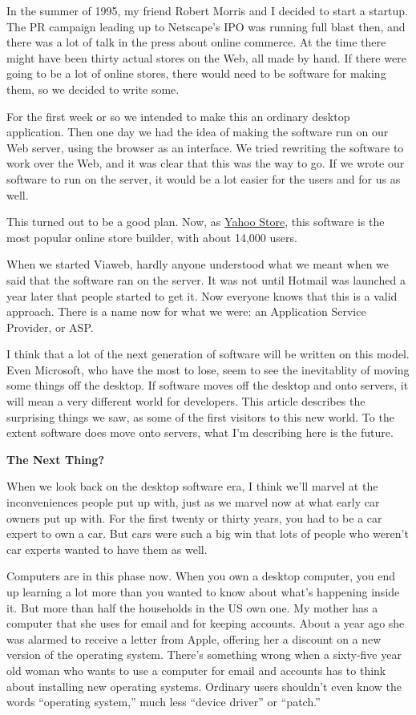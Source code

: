 \documentclass[12pt]{book}
\begin{document}
In the summer of 1995, my friend Robert Morris and I decided to start a
startup. The PR campaign leading up to Netscape's IPO was running full
blast then, and there was a lot of talk in the press about online
commerce. At the time there might have been thirty actual stores on the
Web, all made by hand. If there were going to be a lot of online stores,
there would need to be software for making them, so we decided to write
some.

For the first week or so we intended to make this an ordinary desktop
application. Then one day we had the idea of making the software run on
our Web server, using the browser as an interface. We tried rewriting
the software to work over the Web, and it was clear that this was the
way to go. If we wrote our software to run on the server, it would be a
lot easier for the users and for us as well.

This turned out to be a good plan. Now, as
\href{http://store.yahoo.com}{Yahoo Store}, this software is the most
popular online store builder, with about 14,000 users.

When we started Viaweb, hardly anyone understood what we meant when we
said that the software ran on the server. It was not until Hotmail was
launched a year later that people started to get it. Now everyone knows
that this is a valid approach. There is a name now for what we were: an
Application Service Provider, or ASP.

I think that a lot of the next generation of software will be written on
this model. Even Microsoft, who have the most to lose, seem to see the
inevitablity of moving some things off the desktop. If software moves
off the desktop and onto servers, it will mean a very different world
for developers. This article describes the surprising things we saw, as
some of the first visitors to this new world. To the extent software
does move onto servers, what I'm describing here is the future.

\textbf{The Next Thing?}

When we look back on the desktop software era, I think we'll marvel at
the inconveniences people put up with, just as we marvel now at what
early car owners put up with. For the first twenty or thirty years, you
had to be a car expert to own a car. But cars were such a big win that
lots of people who weren't car experts wanted to have them as well.

Computers are in this phase now. When you own a desktop computer, you
end up learning a lot more than you wanted to know about what's
happening inside it. But more than half the households in the US own
one. My mother has a computer that she uses for email and for keeping
accounts. About a year ago she was alarmed to receive a letter from
Apple, offering her a discount on a new version of the operating system.
There's something wrong when a sixty-five year old woman who wants to
use a computer for email and accounts has to think about installing new
operating systems. Ordinary users shouldn't even know the words
``operating system,'' much less ``device driver'' or ``patch.''
\end{document}
